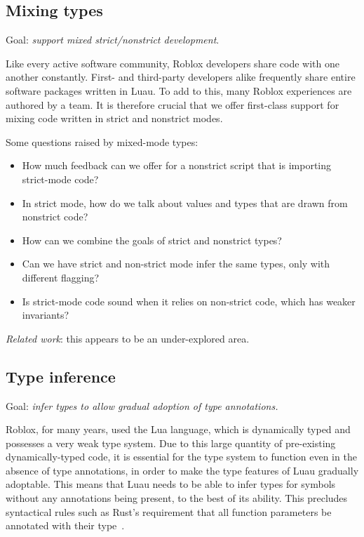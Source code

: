 \documentclass[acmsmall]{acmart}
\begin{document}
\subsection{Mixing types}

Goal: \emph{support mixed strict/nonstrict development}.

Like every active software community, Roblox developers share code
with one another constantly.  First- and third-party developers alike
frequently share entire software packages written in Luau.  To add to
this, many Roblox experiences are authored by a team.  It is therefore
crucial that we offer first-class support for mixing code written in
strict and nonstrict modes.

Some questions raised by mixed-mode types:
\begin{itemize}

\item How much feedback can we offer for a nonstrict script that is
  importing strict-mode code?

\item In strict mode, how do we talk about values and types that are
  drawn from nonstrict code?

\item How can we combine the goals of strict and nonstrict types?

\item Can we have strict and non-strict mode infer the same types,
  only with different flagging?

\item Is strict-mode code sound when it relies on non-strict code,
  which has weaker invariants?

\end{itemize}
\emph{Related work}: this appears to be an under-explored area.

\subsection{Type inference}

Goal: \emph{infer types to allow gradual adoption of type annotations.}

Roblox, for many years, used the Lua language, which is dynamically typed and possesses a
very weak type system. Due to this large quantity of pre-existing dynamically-typed code,
it is essential for the type system to function even in the absence of type annotations,
in order to make the type features of Luau gradually adoptable. This means that Luau needs
to be able to infer types for symbols without any annotations being present, to the best of
its ability. This precludes syntactical rules such as Rust's requirement that all function
parameters be annotated with their type~\cite[Ch. 3.3]{RustBook}.
\end{document}
